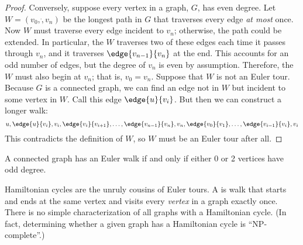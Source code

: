 \begin{staffnotes}
\begin{proof}
Conversely, suppose every vertex in a graph, $G$, has even degree.  Let $W
= (v_0,\dot,v_n)$ be the longest path in $G$ that traverses every edge
\emph{at most} once.  Now $W$ must traverse every edge incident to
$v_n$; otherwise, the path could be extended.  In particular, the $W$
traverses two of these edges each time it passes through $v_n$, and it
traverses $\edge{v_{n-1}}{v_n}$ at the end.  This accounts for an odd
number of edges, but the degree of $v_n$ is even by assumption.
Therefore, the $W$ must also begin at $v_n$; that is, $v_0 = v_n$.
Suppose that $W$ is not an Euler tour.  Because $G$ is a connected
graph, we can find an edge not in $W$ but incident to some vertex in
$W$.  Call this edge $\edge{u}{v_i}$.  But then we can construct a
longer walk:
%
\[
u, \edge{u}{v_i}, v_i, \edge{v_i}{v_{i+1}}, 
\dots, 
\edge{v_{n-1}}{v_n}, v_n, \edge{v_0}{v_1}, 
\dots, 
\edge{v_{i-1}}{v_i}, v_i
\]
%
This contradicts the definition of $W$, so $W$ must be an
Euler tour after all.
\end{proof}
\begin{corollary}
A connected graph has an Euler walk if and only if either 0 or 2
vertices have odd degree.
\end{corollary}
Hamiltonian cycles are the unruly cousins of Euler tours.  A
 is walk that starts and ends at the same vertex
and visits every \emph{vertex} in a graph exactly once.  There is no
simple characterization of all graphs with a Hamiltonian cycle.  (In fact,
determining whether a given graph has a Hamiltonian cycle is
``NP-complete''.)

\end{staffnotes}

\begin{problems}
\classproblems
{}

\homeworkproblems
{}
\end{problems}



